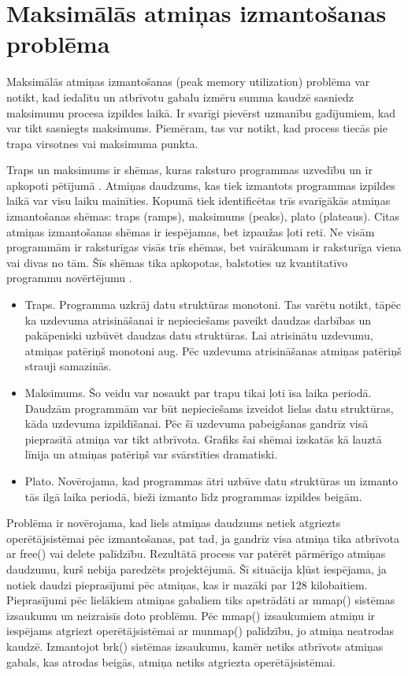 \section{Maksimālās atmiņas izmantošanas problēma}
 \label{sec:peak_mem}
 Maksimālās atmiņas izmantošanas (peak memory utilization) problēma var notikt, kad iedalītu un atbrīvotu gabalu izmēru summa kaudzē sasniedz maksimumu procesa izpildes laikā.
Ir svarīgi pievērst uzmanību gadījumiem, kad var tikt sasniegts maksimums.
Piemēram, tas var notikt, kad process tiecās pie trapa virsotnes vai maksimuma punkta.

Traps un maksimums ir shēmas, kuras raksturo programmas uzvedību un ir apkopoti pētījumā \cite{PWMS}. Atmiņas daudzums, kas tiek izmantots programmas izpildes laikā var visu laiku mainīties.
Kopumā tiek identificētas trīs svarīgākās atmiņas izmantošanas shēmas: traps (ramps),  maksimums (peaks),  plato (plateaus).
Citas atmiņas izmantošanas shēmas ir iespējamas, bet izpaužas ļoti reti.
Ne visām programmām ir raksturīgas visās trīs shēmas, bet vairākumam ir raksturīga viena vai divas no tām.
Šīs shēmas tika apkopotas, balstoties uz kvantitatīvo programmu novērtējumu \cite{PWMS}. 
\begin{itemize}
\item Traps. Programma uzkrāj datu struktūras monotoni. 
Tas varētu notikt, tāpēc ka uzdevuma atrisināšanai ir nepieciešams paveikt daudzas darbības un pakāpeniski uzbūvēt daudzas  datu struktūras. 
Lai atrisinātu uzdevumu, atmiņas patēriņš monotoni aug. Pēc uzdevuma atrisināšanas atmiņas patēriņš strauji samazinās.
\item Maksimums. Šo veidu var nosaukt par trapu tikai ļoti īsa laika periodā.
Daudzām programmām var būt nepieciešams izveidot lielas datu struktūras, kāda uzdevuma izpildīšanai.
Pēc šī uzdevuma pabeigšanas gandrīz visā pieprasītā atmiņa var tikt atbrīvota.
Grafiks šai shēmai izskatās kā lauztā līnija un atmiņas patēriņš var svārstīties dramatiski.
\item Plato. Novērojama, kad programmas ātri uzbūve datu struktūras un izmanto tās ilgā laika periodā, bieži izmanto līdz programmas izpildes beigām.
\end{itemize}


Problēma ir novērojama, kad liels atmiņas daudzums netiek atgriezts operētājsistēmai pēc izmantošanas, pat tad, ja gandrīz visa atmiņa tika atbrīvota ar free() vai delete palīdzību.
Rezultātā process var patērēt pārmērīgo atmiņas daudzumu, kurš nebija paredzēts projektējumā.
Šī situācija kļūst iespējama, ja notiek daudzi pieprasījumi pēc atmiņas, kas ir mazāki par 128 kilobaitiem.
Pieprasījumi pēc lielākiem atmiņas gabaliem tiks apstrādāti ar mmap() sistēmas izsaukumu un neizraisīs doto problēmu.
Pēc mmap() izsaukumiem atmiņu ir iespējams atgriezt operētājsistēmai ar munmap() palīdzību, jo atmiņa neatrodas kaudzē. 
Izmantojot brk() sistēmas izsaukumu, kamēr netiks atbrīvots atmiņas gabals, kas atrodas beigās, atmiņa netiks atgriezta operētājsistēmai.

